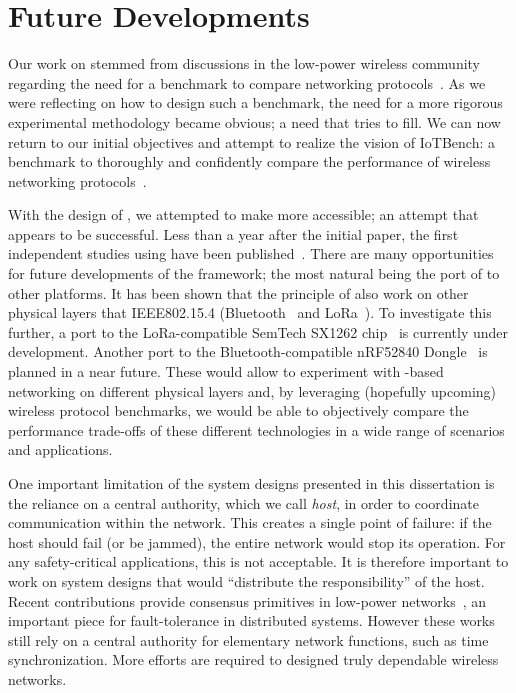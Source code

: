 \section{Future Developments}

Our work on \triscale stemmed from discussions in the low-power wireless community regarding the need for a benchmark to compare networking protocols~\cite{boano2018IoTBench}.
As we were reflecting on how to design such a benchmark, the need for a more rigorous experimental methodology became obvious; a need that \triscale tries to fill.
We can now return to our initial objectives and attempt to realize the vision of IoTBench: a benchmark to thoroughly and confidently compare the performance of wireless networking protocols~\cite{IoTBench_website}.

With the design of \baloo, we attempted to make \ST more accessible; an attempt that appears to be successful. Less than a year after the initial paper, the first independent studies using \baloo have been published~\cite{spina2019XPC}.
There are many opportunities for future developments of the framework; the most natural being the port of \baloo to other platforms.
It has been shown that the principle of \ST also work on other physical layers that IEEE802.15.4 (\eg Bluetooth~\cite{alnahas2019BlueFlood} and LoRa~\cite{wegmann2018Reliable}).
To investigate this further, a port to the LoRa-compatible SemTech SX1262 chip~\cite{semtechSX1262} is currently under development.
Another port to the Bluetooth-compatible nRF52840 Dongle~\cite{nRF52840} is planned in a near future.
%
These would allow to experiment with \ST-based networking on different physical layers and, by leveraging (hopefully upcoming) wireless protocol benchmarks, we would be able to objectively compare the performance trade-offs of these different technologies in a wide range of scenarios and applications.

One important limitation of the system designs presented in this dissertation is the reliance on a central authority, which we call \emph{host}, in order to coordinate communication within the network.
This creates a single point of failure: if the host should fail (or be jammed), the entire network would stop its operation.
For any safety-critical applications, this is not acceptable.
It is therefore important to work on system designs that would ``distribute the responsibility'' of the host.
Recent contributions provide consensus primitives in low-power networks~\cite{spina2019XPC, alnahas2019BlueFlood,poirot2019Paxos}, an important piece for fault-tolerance in distributed systems.
However these works still rely on a central authority for elementary network functions, such as time synchronization.
More efforts are required to designed truly dependable wireless networks.

